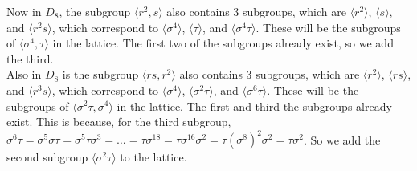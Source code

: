 \documentclass[12pt]{article}
\begin{document}
    Now in $D_8$,
    the subgroup $\langle r^2, s  \rangle$
    also contains 3 subgroups,
    which are $\langle r^2 \rangle$,
    $\langle s \rangle$,
    and $\langle r^2s \rangle$,
    which correspond to
    $\langle \sigma^4 \rangle$,
    $\langle \tau \rangle$,
    and $\langle \sigma^4\tau \rangle$.
    These will be the subgroups of
    $\langle \sigma^4, \tau \rangle$ in the lattice.
    The first two of the subgroups already exist,
    so we add the third. \\
    Also in $D_8$ is the subgroup $\langle rs, r^2  \rangle$
    also contains 3 subgroups,
    which are $\langle r^2 \rangle$,
    $\langle rs \rangle$,
    and $\langle r^3s \rangle$,
    which correspond to
    $\langle \sigma^4 \rangle$,
    $\langle \sigma^2\tau \rangle$,
    and $\langle \sigma^6\tau \rangle$.
    These will be the subgroups of
    $\langle \sigma^2\tau, \sigma^4 \rangle$ in the lattice.
    The first and third the subgroups already exist.
    This is because, for the third subgroup,
    $\sigma^6\tau = \sigma^{5}\sigma\tau = \sigma^5\tau\sigma^3 = \dots
    = \tau\sigma^{18} = \tau\sigma^{16}\sigma^2
    = \tau(\sigma^{8})^2\sigma^2 = \tau\sigma^2$.
    So we add the second subgroup $\langle \sigma^2\tau \rangle$
    to the lattice.
\end{document}
